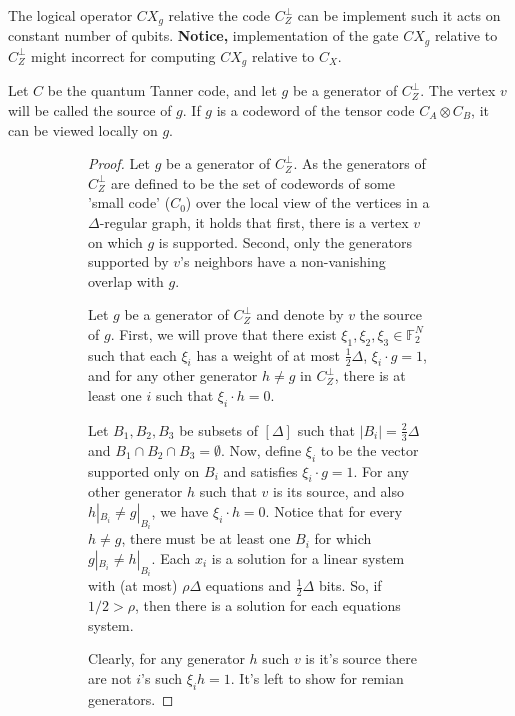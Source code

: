 \documentclass[manuscript,screen,review]{acmart}
\begin{document}
\begin{claim}
  The logical operator $CX_{g}$ relative the code $C_{Z}^{\perp}$ can be implement such it acts on constant number of qubits. \textbf{Notice,} implementation of the gate $CX_{g}$ relative to $C_{Z}^{\perp}$ might incorrect for computing $CX_{g}$ relative to $C_{X}$. 
\end{claim}

\begin{definition} 
Let $C$ be the quantum Tanner code, and let $g$ be a generator of $C_{Z}^{\perp}$. The vertex $v$ will be called the source of $g$. If $g$ is a codeword of the tensor code $C_{A}\otimes C_{B}$, it can be viewed locally on $g$.
\end{definition}

\begin{figure}[h]
  \begin{subfigure}{0.5\textwidth}
    \begin{proof}
Let $g$ be a generator of $C_{Z}^{\perp}$. As the generators of $C_{Z}^\perp$ are defined to be the set of codewords of some 'small code' ($C_{0}$) over the local view of the vertices in a $\Delta$-regular graph, it holds that first, there is a vertex $v$ on which $g$ is supported. Second, only the generators supported by $v$'s neighbors have a non-vanishing overlap with $g$.


Let $g$ be a generator of $C_{Z}^{\perp}$ and denote by $v$ the source of $g$. First, we will prove that there exist $\xi_{1}, \xi_{2}, \xi_{3} \in \mathbb{F}_{2}^{N}$ such that each $\xi_{i}$ has a weight of at most $\frac{1}{2} \Delta$, $\xi_{i} \cdot g = 1$, and for any other generator $h \neq g$ in $C_{Z}^{\perp}$, there is at least one $i$ such that $\xi_{i} \cdot h = 0$.


Let $B_1, B_2, B_3$ be subsets of $[\Delta]$ such that $|B_i| = \frac{2}{3}\Delta$ and $B_1 \cap B_2 \cap B_3 = \emptyset$. Now, define $\xi_i$ to be the vector supported only on $B_i$ and satisfies $\xi_i \cdot g = 1$. For any other generator $h$ such that $v$ is its source, and also $h|_{B_{i}} \neq g|_{B_{i}}$, we have $\xi_i \cdot h = 0$. Notice that for every $h \neq g$, there must be at least one $B_{i}$ for which $g|_{B_{i}} \neq h|_{B_{i}}$. Each $x_{i}$ is a solution for a linear system with (at most) $\rho\Delta$ equations and $\frac{1}{2} \Delta$ bits. So, if $1/2 > \rho$, then there is a solution for each equations system.

Clearly, for any generator $h$ such $v$ is it's source there are not $i$'s such $\xi_{i}h = 1$. It's left to show for remian generators. 


\end{proof}
\end{subfigure}
\end{figure}
\end{document}
